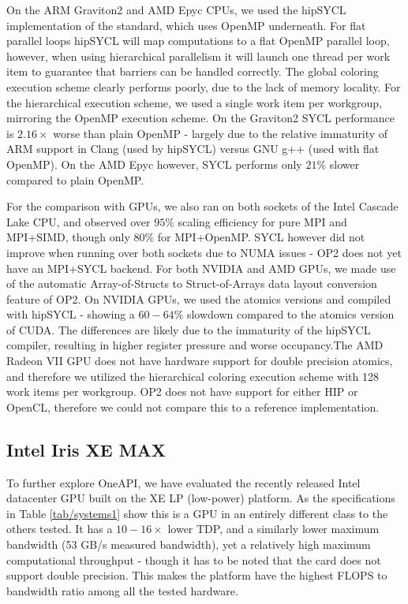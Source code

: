 \documentclass[runningheads]{llncs}
\begin{document}
On the ARM Graviton2 and AMD Epyc CPUs, we used the hipSYCL implementation of 
the standard, which uses OpenMP underneath. For flat parallel loops hipSYCL will 
map computations to a flat OpenMP parallel loop, however, when using 
hierarchical parallelism it will launch one thread per work item to guarantee 
that barriers can be handled correctly. The global coloring execution scheme 
clearly performs poorly, due to the lack of memory locality. For the 
hierarchical execution scheme, we used a single work item per workgroup, 
mirroring the OpenMP execution scheme. On the Graviton2 SYCL performance is 
$2.16\times$ worse than plain OpenMP - largely due to the relative immaturity of 
ARM support in Clang (used by hipSYCL) versus GNU g++ (used with flat OpenMP). 
On the AMD Epyc however, SYCL performs only $21\%$ slower compared to plain 
OpenMP.

For the comparison with GPUs, we also ran on both sockets of the Intel Cascade 
Lake CPU, and observed over $95\%$ scaling efficiency for pure MPI and MPI+SIMD, 
though only $80\%$ for MPI+OpenMP. SYCL however did not improve when running 
over both sockets due to NUMA issues - OP2 does not yet have an MPI+SYCL 
backend. For both NVIDIA and AMD GPUs, we made use of the automatic 
Array-of-Structs to Struct-of-Arrays data layout conversion feature of OP2. On 
NVIDIA GPUs, we used the atomics versions and compiled with hipSYCL - showing a 
$60-64\%$ slowdown compared to the atomics version of CUDA. The differences are 
likely due to the immaturity of the hipSYCL compiler, resulting in higher 
register pressure and worse occupancy.The AMD Radeon VII GPU does not have 
hardware support for double precision atomics, and therefore we utilized the 
hierarchical coloring execution scheme with 128 work items per workgroup. OP2 
does not have support for either HIP or OpenCL, therefore we could not compare 
this to a reference implementation.

\vspace{-10pt}
\subsection{Intel Iris XE MAX}
\vspace{-5pt}

To further explore OneAPI, we have evaluated the recently released Intel 
datacenter GPU built on the XE LP (low-power) platform. As the specifications in 
Table \ref{tab/systems1} show this is a GPU in an entirely different class to 
the others tested. It has a $10-16\times$ lower TDP, and a similarly lower 
maximum bandwidth (53 GB/s measured bandwidth), yet a relatively high maximum 
computational throughput - though it has to be noted that the card does not 
support double precision. This makes the platform have the highest FLOPS to 
bandwidth ratio among all the tested hardware. 
\end{document}
